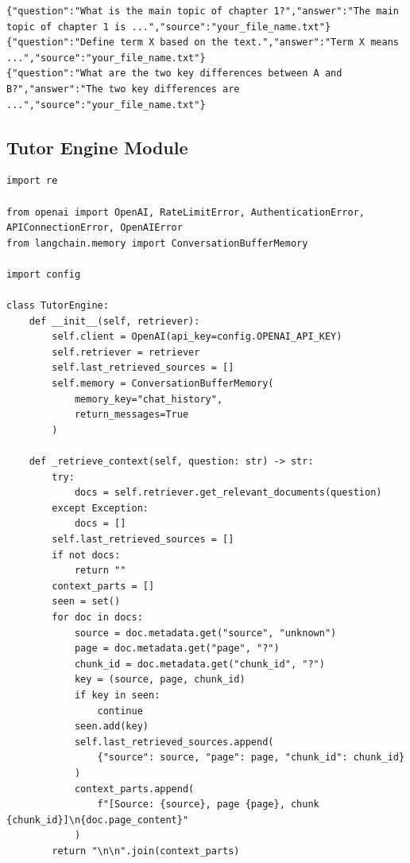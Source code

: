 \documentclass[12pt,a4paper]{article}
\begin{document}
\begin{lstlisting}[caption={golden\_dataset.jsonl (sample)}]
{"question":"What is the main topic of chapter 1?","answer":"The main topic of chapter 1 is ...","source":"your_file_name.txt"}
{"question":"Define term X based on the text.","answer":"Term X means ...","source":"your_file_name.txt"}
{"question":"What are the two key differences between A and B?","answer":"The two key differences are ...","source":"your_file_name.txt"}
\end{lstlisting}

\subsection*{Tutor Engine Module}
\begin{lstlisting}[caption={tutor\_engine.py}]
import re

from openai import OpenAI, RateLimitError, AuthenticationError, APIConnectionError, OpenAIError
from langchain.memory import ConversationBufferMemory

import config

class TutorEngine:
    def __init__(self, retriever):
        self.client = OpenAI(api_key=config.OPENAI_API_KEY)
        self.retriever = retriever
        self.last_retrieved_sources = []
        self.memory = ConversationBufferMemory(
            memory_key="chat_history",
            return_messages=True
        )

    def _retrieve_context(self, question: str) -> str:
        try:
            docs = self.retriever.get_relevant_documents(question)
        except Exception:
            docs = []
        self.last_retrieved_sources = []
        if not docs:
            return ""
        context_parts = []
        seen = set()
        for doc in docs:
            source = doc.metadata.get("source", "unknown")
            page = doc.metadata.get("page", "?")
            chunk_id = doc.metadata.get("chunk_id", "?")
            key = (source, page, chunk_id)
            if key in seen:
                continue
            seen.add(key)
            self.last_retrieved_sources.append(
                {"source": source, "page": page, "chunk_id": chunk_id}
            )
            context_parts.append(
                f"[Source: {source}, page {page}, chunk {chunk_id}]\n{doc.page_content}"
            )
        return "\n\n".join(context_parts)


\end{lstlisting}
\end{document}
